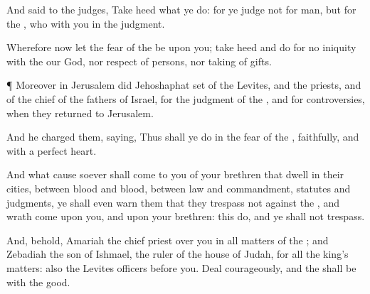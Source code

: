 {And
said to the
judges, Take
heed what ye
do: for ye
judge not for
man, but for the
{}, who
{} with you in the
judgment.

Wherefore now let the
fear of the
{} be upon you; take
heed and
do
{} for
{} no
iniquity with the
{} our
God, nor
respect of
persons, nor
taking of
gifts.


\par }{\PP {}¶ Moreover in
Jerusalem did
Jehoshaphat
set of the
Levites, and
{} the
priests, and of the
chief of the
fathers of
Israel, for the
judgment of the
{}, and for
controversies, when they
returned to
Jerusalem.

And he
charged them,
saying, Thus shall ye
do in the
fear of the
{},
faithfully, and with a
perfect
heart.

And what
cause soever shall
come to you of your
brethren that
dwell in their
cities, between
blood and
blood, between
law and
commandment,
statutes and
judgments, ye shall even
warn them that they
trespass not against the
{}, and
{}
wrath come upon you, and upon your
brethren:
this
do, and ye shall not
trespass.

And, behold,
Amariah the
chief
priest
{} over you in all
matters of the
{}; and
Zebadiah the
son of
Ishmael, the
ruler of the
house of
Judah, for all the
king’s
matters: also the
Levites
{}
officers
before you.
Deal
courageously, and the
{} shall be with the
good.




\par }
